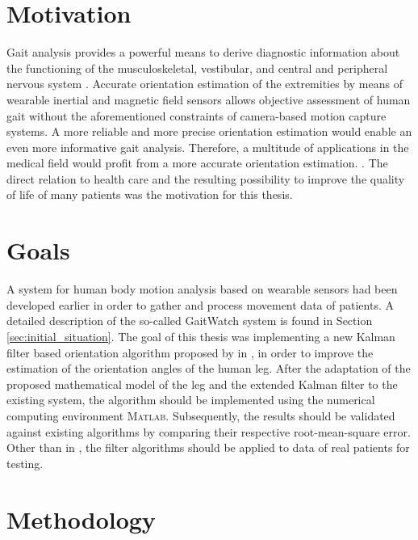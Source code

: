 \section{Motivation}

Gait analysis provides a powerful means to derive diagnostic information about the functioning of the musculoskeletal, vestibular, and central and peripheral nervous system \cite{bennett_extended_2013}. Accurate orientation estimation of the extremities by means of wearable inertial and magnetic field sensors allows objective assessment of human gait without the aforementioned constraints of camera-based motion capture systems. A more reliable and more precise orientation estimation would enable an even more informative gait analysis. Therefore, a multitude of applications in the medical field would profit from a more accurate orientation estimation. \cite{wong_clinical_2007}. The direct relation to health care and the resulting possibility to improve the quality of life of many patients was the motivation for this thesis.

\section{Goals}

A system for human body motion analysis based on wearable sensors had been developed earlier in order to gather and process  movement data of patients. A detailed description of the so-called GaitWatch system is found in Section \ref{sec:initial_situation}. The goal of this thesis was implementing a new Kalman filter based orientation algorithm proposed by \citeauthor{bennett_motion_2014} in \cite{bennett_motion_2014}, in order to improve the estimation of the orientation angles of the human leg. After the adaptation of the proposed mathematical model of the leg and the extended Kalman filter to the existing system, the algorithm should be implemented using the numerical computing environment \textsc{Matlab}\textsuperscript{\textregistered}. Subsequently, the results should be validated against existing algorithms by comparing their respective root-mean-square error. Other than in \cite{bennett_motion_2014}, the filter algorithms should be applied to data of real patients for testing.

\section{Methodology}

